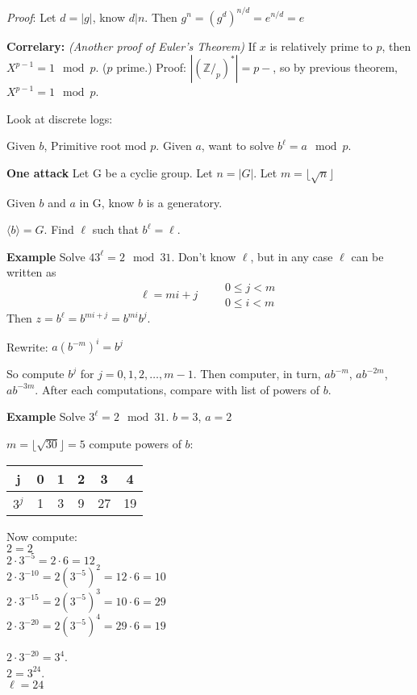\textit{Proof}: Let $d = |g|$, know $d|n$. Then $g^n = (g^d)^{n/d} = e^{n/d} = e$

\textbf{Correlary:} \textit{(Another proof of Euler's Theorem)} If $x$ is relatively prime to $p$, then $X^{p-1} = 1 \mod p$. ($p$ prime.)
Proof: $|(\mathbb{Z}/_p)^*| = p-$, so by previous theorem, $X^{p-1} = 1 \mod p$.

Look at discrete logs:

Given $b$, Primitive root mod $p$. Given $a$, want to solve $b^\ell = a \mod p$.

\textbf{One attack} Let G be a cyclie group. Let $n = |G|$. Let $m = \lfloor\sqrt{n}\rfloor$

Given $b$ and $a$ in G, know $b$ is a generatory.

$\langle b \rangle = G.$ Find $\ell$ such that $b^\ell = \ell$.

\textbf{Example} Solve $43^\ell = 2 \mod 31$. Don't know $\ell$, but in any case $\ell$ can be written as
\[
\ell = mi + j \qquad 
\begin{array}{c}
	0 \leq j < m \\ 
	0 \leq i < m
\end{array}
\]
Then $z = b^\ell = b^{mi+j} = b^{mi}b^j$.

Rewrite: $a(b^{-m})^i = b^j$

So compute $b^j$ for $j=0,1,2,\ldots,m-1$. Then computer, in turn, $ab^{-m}$, $ab^{-2m}$,$ab^{-3m}$. After each computations, compare with list of powers of $b$.

\textbf{Example} Solve $3^\ell = 2 \mod 31$. $b=3$, $a=2$

$m = \lfloor\sqrt{30}\rfloor = 5$
compute powers of $b$:\\
\begin{tabular}{|c|c|c|c|c|c|}\hline
	j & 0 & 1 & 2 & 3 & 4 \\ \hline
	$3^j$ & 1 & 3 & 9 & 27 & 19 \\ \hline
\end{tabular}

Now compute:\\
$2 = 2$ \\
$2\cdot 3^{-5} = 2 \cdot 6 = 12$ \\
$2\cdot 3^{-10} = 2(3^{-5})^2 = 12 \cdot 6 = 10$ \\
$2\cdot 3^{-15} = 2(3^{-5})^3 = 10 \cdot 6 = 29$ \\
$2\cdot 3^{-20} = 2(3^{-5})^4 = 29 \cdot 6 = 19$

$2 \cdot 3^{-20} = 3^4$.\\
$2 = 3^{24}$. \\
$\ell = 24$

